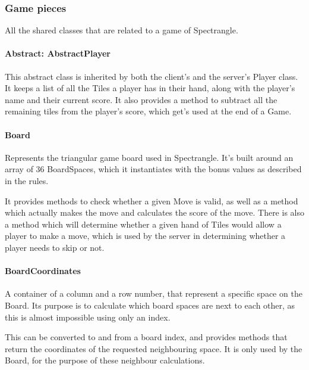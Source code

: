 \documentclass[12pt, letterpaper]{article}
\begin{document}


    \subsubsection{Game pieces}

    All the shared classes that are related to a game of Spectrangle.

    \paragraph{Abstract: AbstractPlayer}
    This abstract class is inherited by both the client's and the server's Player class.
    It keeps a list of all the Tiles a player has in their hand, along with the player's name
    and their current score.
    It also provides a method to subtract all the remaining tiles from the player's score, which get's used at the end
    of a Game.

    \paragraph{Board}
    Represents the triangular game board used in Spectrangle.
    It's built around an array of 36 BoardSpaces, which it instantiates with the bonus values as described in the rules.

    It provides methods to check whether a given Move is valid, as well as a method which actually makes the move
    and calculates the score of the move.
    There is also a method which will determine whether a given hand of Tiles would allow a player to make a move,
    which is used by the server in determining whether a player needs to skip or not.

    \paragraph{BoardCoordinates}
    A container of a column and a row number, that represent a specific space on the Board.
    Its purpose is to calculate which board spaces are next to each other, as this is almost
    impossible using only an index.

    This can be converted to and from a board index, and provides methods that return the coordinates of
    the requested neighbouring space.
    It is only used by the Board, for the purpose of these neighbour calculations.
\end{document}

